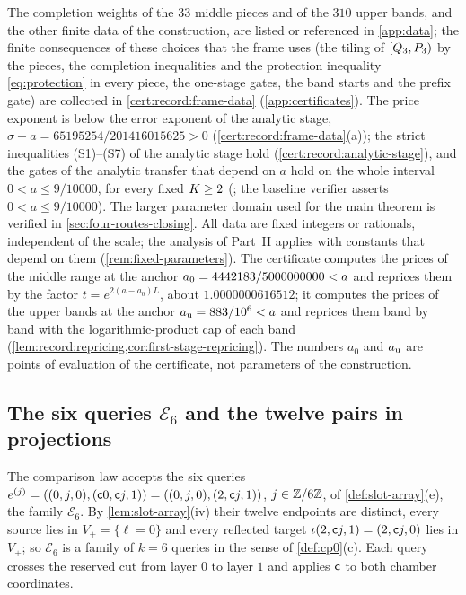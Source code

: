 The completion weights of the $33$ middle pieces and of the $310$ upper bands,
and the other finite data of the construction, are listed or referenced in
\cref{app:data}; the finite consequences of these choices that the frame uses
(the tiling of $[Q_3,P_3)$ by the pieces, the completion inequalities and
the protection inequality \eqref{eq:protection} in every piece, the
one-stage gates, the band starts and the
prefix gate) are collected in \cref{cert:record:frame-data}
(\cref{app:certificates}). The price exponent is below the error exponent of
the analytic stage, $\sigma-a=65195254/201416015625>0$
(\cref{cert:record:frame-data}(a)); the strict inequalities (S1)--(S7) of the
analytic stage hold (\cref{cert:record:analytic-stage}), and the gates of the
analytic transfer that depend on $a$ hold on the whole interval
$0<a\le9/10000$, for every fixed $K\ge2$
(; the baseline
verifier asserts $0<a\le9/10000$). The larger parameter domain used for
the main theorem is verified in \cref{sec:four-routes-closing}.
All data are fixed integers or rationals,
independent of the scale; the analysis of Part~II applies with constants that
depend on them (\cref{rem:fixed-parameters}). The certificate computes the
prices of the middle range at the anchor $a_0=4442183/5000000000<a$ and reprices them by
the factor $t=e^{2(a-a_0)L}$, about $1.0000000616512$; it computes the prices of the
upper bands at the anchor $a_{\rm u}=883/10^6<a$ and reprices them band by band
with the logarithmic-product cap of each band
(\cref{lem:record:repricing,cor:first-stage-repricing}). The numbers $a_0$ and
$a_{\rm u}$ are points of evaluation of the certificate, not parameters of the
construction.

\subsection{The six queries \texorpdfstring{$\mathcal E_6$}{E\_6} and the twelve pairs in projections}\label{subsec:front6:construction}

The comparison law accepts the six queries
$e^{(j)}=((0,j,0),(\mathsf c0,\mathsf c j,1))=((0,j,0),(2,\mathsf c j,1))$, $j\in\mathbb Z/6\mathbb Z$, of
\cref{def:slot-array}(e), the family $\mathcal E_6$. By \cref{lem:slot-array}(iv)
their twelve endpoints are distinct, every source lies in $V_+=\{\ell=0\}$ and
every reflected target $\iota(2,\mathsf c j,1)=(2,\mathsf c j,0)$ lies in $V_+$; so
$\mathcal E_6$ is a family of $k=6$ queries in the sense of \cref{def:cp0}(c).
Each query crosses the reserved cut from layer $0$ to layer $1$ and applies
$\mathsf c$ to both chamber coordinates.

